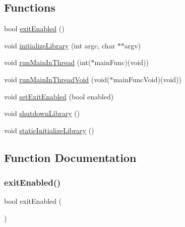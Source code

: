 \subsection*{Functions}
\begin{DoxyCompactItemize}
\item 
bool \mbox{\hyperlink{namespacestanfordcpplib_a5bb1fbda6b82680cc8f04064e55a85c6}{exit\+Enabled}} ()
\item 
void \mbox{\hyperlink{namespacestanfordcpplib_ab36f2e19ed11765f2b025cc8e4636010}{initialize\+Library}} (int argc, char $\ast$$\ast$argv)
\item 
void \mbox{\hyperlink{namespacestanfordcpplib_ab6f7bb8a7230f2d95cf1ff0d6f2fbf0e}{run\+Main\+In\+Thread}} (int($\ast$main\+Func)(void))
\item 
void \mbox{\hyperlink{namespacestanfordcpplib_a647c2bc343e4e0d30483590a58ad3884}{run\+Main\+In\+Thread\+Void}} (void($\ast$main\+Func\+Void)(void))
\item 
void \mbox{\hyperlink{namespacestanfordcpplib_afa57f85846177bb4ed2b4b12fa8a758d}{set\+Exit\+Enabled}} (bool enabled)
\item 
void \mbox{\hyperlink{namespacestanfordcpplib_a2937cb1c4385064875d0cb29fcdfeae6}{shutdown\+Library}} ()
\item 
void \mbox{\hyperlink{namespacestanfordcpplib_ad5dc96d7e324f70b6bd681ad41abcaa7}{static\+Initialize\+Library}} ()
\end{DoxyCompactItemize}


\subsection{Function Documentation}
\mbox{\label{namespacestanfordcpplib_a5bb1fbda6b82680cc8f04064e55a85c6}} 
\subsubsection{\texorpdfstring{exit\+Enabled()}{exitEnabled()}}
{\footnotesize\ttfamily bool exit\+Enabled (\begin{DoxyParamCaption}{ }\end{DoxyParamCaption})}

\mbox{\label{namespacestanfordcpplib_ab36f2e19ed11765f2b025cc8e4636010}} 
